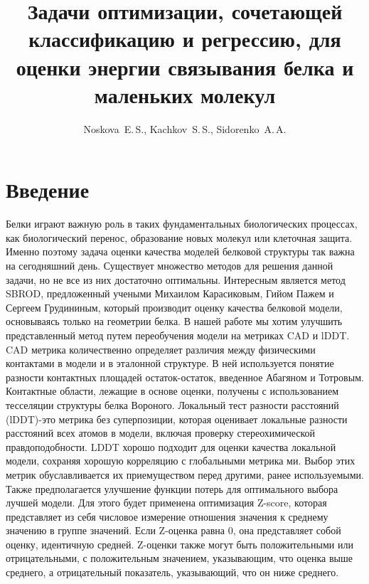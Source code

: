 \documentclass[12pt,twoside]{article}
\begin{document}
\title{Задачи оптимизации, сочетающей классификацию и регрессию, для оценки энергии связывания белка и маленьких молекул}
\author{Noskova~E.\,S., Kachkov~S.\,S., Sidorenko~A.\,A.}

\maketitle
\section{Введение}
Белки играют важную роль в таких фундаментальных биологических процессах, как биологический перенос, образование новых молекул или клеточная защита. Именно поэтому задача оценки качества моделей белковой структуры так важна на сегодняшний день. Существует множество методов для решения данной задачи, но не все из них достаточно оптимальны. Интересным является метод SBROD, предложенный учеными Михаилом Карасиковым, Гийом Пажем и Сергеем Грудининым, который производит оценку качества белковой модели, основываясь только на геометрии белка. В нашей работе мы хотим улучшить представленный метод путем переобучения модели на метриках CAD и lDDT.
CAD метрика количественно определяет различия между физическими контактами в модели и в эталонной структуре. В ней используется понятие разности контактных площадей остаток-остаток, введенное Абагяном и Тотровым. Контактные области, лежащие в основе оценки, получены с использованием тесселяции структуры белка Вороного. Локальный тест разности расстояний (lDDT)-это метрика без суперпозиции, которая оценивает локальные разности расстояний всех атомов в модели, включая проверку стереохимической правдоподобности. LDDT хорошо подходит для оценки качества локальной модели, сохраняя хорошую корреляцию с глобальными метрика ми.
Выбор этих метрик обуславливается их приемуществом перед другими, ранее используемыми. Также предполагается улучшение функции потерь для оптимального выбора лучшей модели. Для этого будет применена оптимизация Z-score, которая представляет из себя числовое измерение отношения значения к среднему значению в группе значений. Если Z-оценка равна 0, она представляет собой оценку, идентичную средней. Z-оценки также могут быть положительными или отрицательными, с положительным значением, указывающим, что оценка выше среднего, а отрицательный показатель, указывающий, что он ниже среднего.
\bigskip
\nocite{*}


\end{document}
